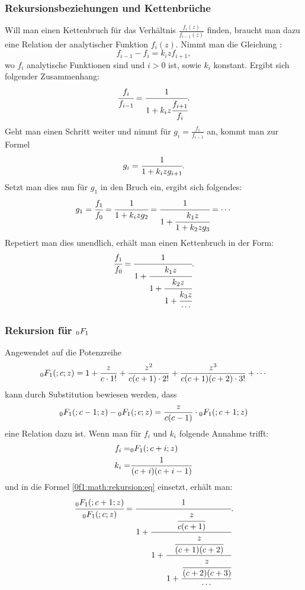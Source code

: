 \subsubsection{Rekursionsbeziehungen und Kettenbrüche}
Will man einen Kettenbruch für das Verhältnis $\frac{f_i(z)}{f_{i-1}(z)}$ finden, braucht man dazu eine Relation der analytischer Funktion $f_i(z)$.
Nimmt man die Gleichung \cite{0f1:wiki-fraction}:
\begin{equation*}
	f_{i-1} - f_i = k_i z f_{i+1},
\end{equation*}
wo $f_i$ analytische Funktionen sind und $i > 0$ ist, sowie $k_i$ konstant.
Ergibt sich folgender Zusammenhang:
\begin{equation*}
	\cfrac{f_i}{f_{i-1}} = \cfrac{1}{1+k_iz\cfrac{f_{i+1}}{f_i}}.
\end{equation*}
Geht man einen Schritt weiter und nimmt für $g_i = \frac{f_i}{f_{i-1}}$ an, kommt man zur Formel
\begin{equation*}
	g_i = \cfrac{1}{1+k_izg_{i+1}}.
\end{equation*}
Setzt man dies nun für $g_1$ in den Bruch ein, ergibt sich folgendes:
\begin{equation*}
	g_1 = \cfrac{f_1}{f_0} = \cfrac{1}{1+k_izg_2} = \cfrac{1}{1+\cfrac{k_1z}{1+k_2zg_3}} = \cdots
\end{equation*}
Repetiert man dies unendlich, erhält man einen Kettenbruch in der Form:
\begin{equation}
	\label{0f1:math:rekursion:eq}
	\cfrac{f_1}{f_0} = \cfrac{1}{1+\cfrac{k_1z}{1+\cfrac{k_2z}{1+\cfrac{k_3z}{\cdots}}}}.
\end{equation}

\subsubsection{Rekursion für $\mathstrut_0F_1$}
Angewendet auf die Potenzreihe
\begin{equation}
	\label{0f1:math:potenzreihe:0f1:eq}
	\mathstrut_0F_1(;c;z) = 1 + \frac{z}{c\cdot1!} + \frac{z^2}{c(c+1)\cdot2!} + \frac{z^3}{c(c+1)(c+2)\cdot3!} + \cdots
\end{equation}
kann durch Substitution bewiesen werden, dass
\begin{equation*}
	\mathstrut_0F_1(;c-1;z) - \mathstrut_0F_1(;c;z) = \frac{z}{c(c-1)} \cdot \mathstrut_0F_1(;c+1;z)
\end{equation*}
eine Relation dazu ist.
Wenn man für $f_i$ und $k_i$ folgende Annahme trifft:
\begin{align*}
	f_i =& \mathstrut_0F_1(;c+i;z)\\
	k_i	=& \frac{1}{(c+i)(c+i-1)}
\end{align*}
und in die Formel \eqref{0f1:math:rekursion:eq} einsetzt, erhält man:
\begin{equation*}
	\cfrac{\mathstrut_0F_1(;c+1;z)}{\mathstrut_0F_1(;c;z)} = \cfrac{1}{1+\cfrac{\cfrac{z}{c(c+1)}}{1+\cfrac{\cfrac{z}{(c+1)(c+2)}}{1+\cfrac{\cfrac{z}{(c+2)(c+3)}}{\cdots}}}}.
\end{equation*}

